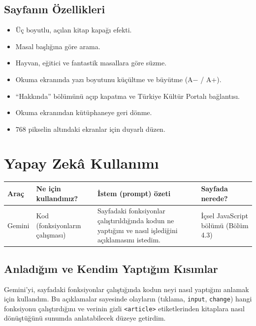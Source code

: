 \documentclass[12pt,a4paper]{article}
\begin{document}
\subsection{Sayfanın Özellikleri}
\begin{itemize}
  \item Üç boyutlu, açılan kitap kapağı efekti.
  \item Masal başlığına göre arama.
  \item Hayvan, eğitici ve fantastik masallara göre süzme.
  \item Okuma ekranında yazı boyutunu küçültme ve büyütme (A$-$ / A+).
  \item ``Hakkında'' bölümünü açıp kapatma ve Türkiye Kültür Portalı bağlantısı.
  \item Okuma ekranından kütüphaneye geri dönme.
  \item 768 pikselin altındaki ekranlar için duyarlı düzen.
\end{itemize}

\section{Yapay Zekâ Kullanımı}

\begin{longtable}{@{}p{2.6cm}p{3.6cm}p{4.2cm}p{3.4cm}@{}}
\toprule
\textbf{Araç} & \textbf{Ne için kullandınız?} & \textbf{İstem (prompt) özeti} & \textbf{Sayfada nerede?} \\
\midrule
\endhead
Gemini & Kod (fonksiyonların çalışması) & Sayfadaki fonksiyonlar çalıştırıldığında kodun ne yaptığını ve nasıl işlediğini açıklamasını istedim. & İçsel JavaScript bölümü (Bölüm 4.3) \\
\bottomrule
\end{longtable}

\subsection{Anladığım ve Kendim Yaptığım Kısımlar}
Gemini'yi, sayfadaki fonksiyonlar çalıştığında kodun neyi nasıl yaptığını anlamak
için kullandım. Bu açıklamalar sayesinde olayların (tıklama, \texttt{input},
\texttt{change}) hangi fonksiyonu çalıştırdığını ve verinin gizli
\texttt{<article>} etiketlerinden kitaplara nasıl dönüştüğünü sunumda anlatabilecek
düzeye getirdim.
\end{document}
